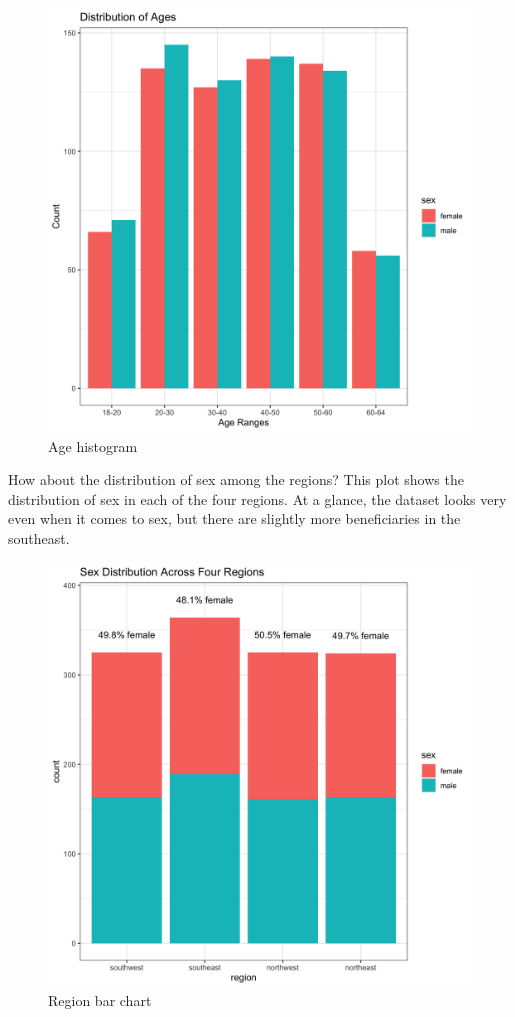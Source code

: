 \documentclass[
]{article}
\begin{document}
\begin{figure}
\centering
\includegraphics{../images/age_histogram.png}
\caption{Age histogram}
\end{figure}

How about the distribution of sex among the regions? This plot shows the
distribution of sex in each of the four regions. At a glance, the
dataset looks very even when it comes to sex, but there are slightly
more beneficiaries in the southeast.

\begin{figure}
\centering
\includegraphics{../images/region_barchart.png}
\caption{Region bar chart}
\end{figure}
\end{document}
